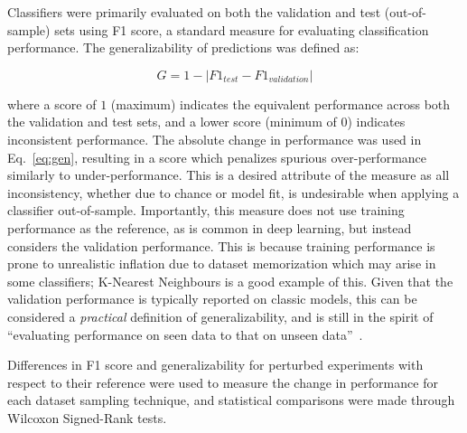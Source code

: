 \documentclass[10pt]{SelfArx} %
\newcommand{\new}[1]{\color{blue}#1\color{black}\xspace}
\begin{document}
Classifiers were primarily evaluated on both the validation and test (out-of-sample) sets using F1 score, a standard
measure for evaluating classification performance. The generalizability of predictions was defined as:

\begin{equation}
G = 1 - \lvert F1_{test} - F1_{validation} \rvert
\label{eq:gen}
\end{equation}

where a score of $1$ (maximum) indicates the equivalent performance across both the validation and test sets, and a
lower score (minimum of $0$) indicates inconsistent performance. The absolute change in performance was used in
Eq.~\ref{eq:gen}, resulting in a score which penalizes spurious over-performance similarly to under-performance. This
is a desired attribute of the measure as all inconsistency, whether due to chance or model fit, is undesirable when
applying a classifier out-of-sample. \new{Importantly, this measure does not use training performance as the reference,
as is common in deep learning, but instead considers the validation performance. This is because training performance
is prone to unrealistic inflation due to dataset memorization which may arise in some classifiers; K-Nearest Neighbours
is a good example of this. Given that the
validation performance is typically reported on classic models, this can be considered a \textit{practical} definition
of generalizability, and is still in the spirit of ``evaluating performance on seen data to that on unseen
data''~\cite{shorten2019survey}}.

Differences in F1 score and generalizability for perturbed experiments with respect to their reference were used to
measure the change in performance for each dataset sampling technique, and statistical comparisons were made
through Wilcoxon Signed-Rank tests.
\end{document}
